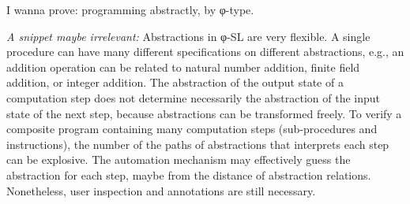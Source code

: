 I wanna prove: programming abstractly, by φ-type.

\emph{A snippet maybe irrelevant:}
Abstractions in φ-SL are very flexible.
A single procedure can have many different specifications on different abstractions, e.g., an addition operation can be related to natural number addition, finite field addition, or integer addition.
The abstraction of the output state of a computation step does not determine necessarily the abstraction of the input state of the next step, because abstractions can be transformed freely.
To verify a composite program containing many computation steps (sub-procedures and instructions), the number of the paths of abstractions that interprets each step can be explosive.
The automation mechanism may effectively guess the abstraction for each step, maybe from the distance of abstraction relations. Nonetheless, user inspection and annotations are still necessary.

